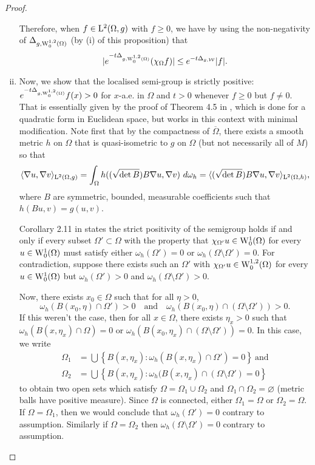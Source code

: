 \documentclass[AMS,STIX1COL]{WileyNJD-v2}
\numberwithin{equation}{section}
\renewcommand{\~}{\tilde}
\renewcommand{\-}{\bar}
\newcommand{\8}{\infty}
\newcommand{\cW}{\mathcal{W}}
\newcommand{\dbrac}[1]{\left\{#1\right\}}
\newcommand{\modulus}[1]{|#1|}
\newcommand{\set}[1]{\dbrac{#1}}
\renewcommand{\emptyset}{\varnothing}
\newcommand{\union}{\cup}
\newcommand{\Union}{\bigcup}
\newcommand{\intersect}{\cap}
\newcommand{\close}[1]{\overline{#1}}		%
\newcommand{\inprod}[1]{\langle #1 \rangle}	%
\newcommand{\Lp}[2][{}]{{\rm L}^{#2}_{\rm #1}}		%
\newcommand{\Sob}[2][{}]{{\rm W}^{#2}_{\rm #1}}		%
\newcommand{\SobH}[2][{}]{{\Sob[#1]{#2,2}}}	%
\begin{document}
\begin{proof}
\begin{enumerate}[(i)]
        Therefore, when $f \in \Lp{2}(\Omega,g)$ with $f \geq 0$, we have by using the non-negativity of $\Delta_{g, \SobH[0]{1}(\Omega)}$ (by (i) of this proposition) that
	$$ \modulus{e^{-t\Delta_{g, \SobH[0]{1}(\Omega)}} (\chi_{\Omega} f)} \leq e^{-t \Delta_{g, \cW}} \modulus{f}.$$

\item Now, we show that the localised semi-group is strictly positive: $e^{-t\Delta_{g,\SobH[0]{1}(\Omega)}}f (x) > 0$ for $x$-a.e. in $\Omega$ and $t>0$ whenever $f \geq 0$ but $f \neq 0$.
	That is essentially given by the proof of Theorem 4.5 in \cite{El-Maati}, which is done for a quadratic form in Euclidean space, but works in this context with minimal modification.
	Note first that by the compactness of $\close{\Omega}$, there exists a smooth metric $h$ on $\Omega$ that is quasi-isometric to $g$ on $\Omega$   (but not necessarily all of $M$) so that 
	$$\inprod{\nabla u, \nabla v}_{\Lp{2}(\Omega,g)} = \int_{\Omega} h((\sqrt{\det B}) B \nabla u, \nabla v)\ d\omega_h = \inprod{(\sqrt{\det B})B \nabla u, \nabla v}_{\Lp{2}(\Omega,h)},
	$$
	where $B$ are symmetric, bounded, measurable coefficients such that $h(Bu,v) = g(u,v)$.

	Corollary 2.11 in \cite{El-Maati} states the strict positivity of the semigroup  holds if and only if every subset $\Omega' \subset \Omega$ with the property that $\chi_{\Omega'} u \in \Sob[0]{1}(\Omega)$ for every $u \in \Sob[0]{1}(\Omega)$ must satisfy either $\omega_h(\Omega') = 0$ or $\omega_h(\Omega\setminus \Omega') = 0$. 
	For contradiction, suppose there exists such an $\Omega'$ with $\chi_{\Omega'} u \in \SobH[0]{1}(\Omega)$ for every $u \in \Sob[0]{1}(\Omega)$ but $\omega_h(\Omega') > 0$ and $\omega_h(\Omega \setminus \Omega') > 0$.

        Now, there exists $x_0 \in \Omega$ such that for all $\eta > 0$,
	$$\omega_h(B(x_0, \eta) \intersect \Omega') > 0\quad\text{and}\quad\omega_h(B(x_0, \eta) \intersect (\Omega\setminus\Omega'))> 0.$$
	If this weren't the case, then for all $x \in \Omega$, there exists $\eta_x > 0$ such that $\omega_h(B(x, \eta_x) \intersect \Omega) = 0$ or $\omega_h(B(x_0, \eta_x) \intersect (\Omega\setminus\Omega')) = 0$. In this case, we write 
	\begin{align*} 
	\Omega_1 &= \Union \set{B(x,\eta_x): \omega_h(B(x, \eta_x) \intersect \Omega') = 0}\ \text{and}\\
	\Omega_2 &= \Union \set{B(x,\eta_x): \omega_h(B(x, \eta_x) \intersect(\Omega \setminus \Omega') = 0}
	\end{align*}
	to obtain two open sets which satisfy $\Omega = \Omega_1 \union \Omega_2$ and $\Omega_1 \intersect \Omega_2 = \emptyset$ (metric balls have positive measure). Since $\Omega$ is connected, either $\Omega_1 = \Omega$ or $\Omega_2 = \Omega$. If $\Omega = \Omega_1$, then we would conclude that $\omega_h(\Omega') = 0$ contrary to assumption. Similarly if $\Omega = \Omega_2$ then $\omega_h(\Omega \setminus \Omega') = 0$ contrary to assumption.


\end{enumerate}
\end{proof}
\end{document}
